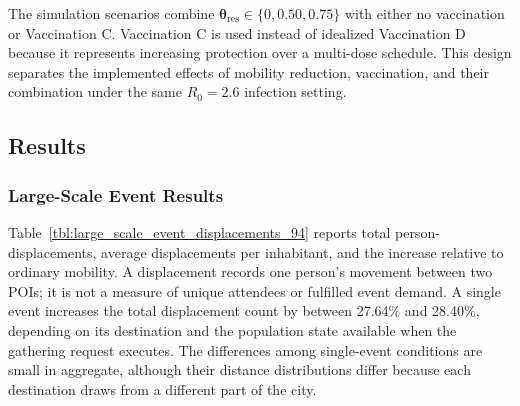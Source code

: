 The simulation scenarios combine $\bm{\theta}_{\mathrm{res}}\in\{0,0.50,0.75\}$ with either no vaccination or Vaccination C. Vaccination C is used instead of idealized Vaccination D because it represents increasing protection over a multi-dose schedule. This design separates the implemented effects of mobility reduction, vaccination, and their combination under the same $R_0=2.6$ infection setting.%

\subsection{Results}
\label{sec:large_scale_epidemic_results}

\subsubsection{Large-Scale Event Results}

Table~\ref{tbl:large_scale_event_displacements_94} reports total person-displacements, average displacements per inhabitant, and the increase relative to ordinary mobility. A displacement records one person's movement between two POIs; it is not a measure of unique attendees or fulfilled event demand. A single event increases the total displacement count by between 27.64\% and 28.40\%, depending on its destination and the population state available when the gathering request executes. The differences among single-event conditions are small in aggregate, although their distance distributions differ because each destination draws from a different part of the city.


